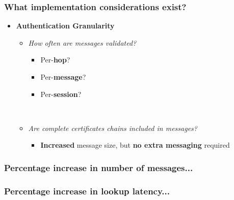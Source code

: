 \documentclass{beamer}
\begin{document}
\begin{frame}
  \frametitle{What implementation considerations exist?}
  \begin{itemize}
  \item{\textbf{Authentication Granularity}}
    \begin{itemize}
    \item{\it How often are messages validated?}
    ~\\
       \begin{itemize}
       \item{Per-\textbf{hop}?}
       \item{Per-\textbf{message}?}
       \item{Per-\textbf{session}?}
       \end{itemize}
    ~\\
    \item{\it Are complete certificates chains included in messages?}
       \begin{itemize}
       \item{\textbf{Increased} message size, but \textbf{no extra messaging} required}
       \end{itemize}
    \end{itemize}
  \end{itemize}
\end{frame}

\begin{frame}
  \frametitle{Percentage increase in number of messages...}

  \begin{center}
  \end{center}

\end{frame}

\begin{frame}
  \frametitle{Percentage increase in lookup latency...}

  \begin{center}
  \end{center}

\end{frame}
\end{document}
